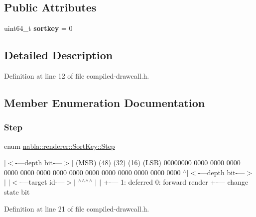 \subsection*{Public Attributes}
\begin{DoxyCompactItemize}
\item 
\mbox{\label{structnabla_1_1renderer_1_1_sort_key_a794eaacb6718584c3b6d2110cbca1c0e}} 
uint64\+\_\+t {\bfseries sortkey} = 0
\end{DoxyCompactItemize}


\subsection{Detailed Description}


Definition at line 12 of file compiled-\/drawcall.\+h.



\subsection{Member Enumeration Documentation}
\mbox{\label{structnabla_1_1renderer_1_1_sort_key_ae0121b7c60133bb8c0bf82785307f53a}} 
\subsubsection{\texorpdfstring{Step}{Step}\hspace{0.1cm}{\footnotesize\ttfamily [1/2]}}
{\footnotesize\ttfamily enum \mbox{\hyperlink{structnabla_1_1renderer_1_1_sort_key_ae0121b7c60133bb8c0bf82785307f53a}{nabla\+::renderer\+::\+Sort\+Key\+::\+Step}}}

$\vert$$<$-\/---depth bit-\/---$>$$\vert$ (M\+SB) (48) (32) (16) (L\+SB) 00000000 0000 0000 0000 0000 0000 0000 0000 0000 0000 0000 0000 0000 0000 0000 $^\wedge$$\vert$$<$-\/---depth bit-\/---$>$$\vert$ $\vert$$<$-\/---target id-\/---$>$$\vert$ $^\wedge$$^\wedge$$^\wedge$$^\wedge$ $\vert$ $\vert$ +-\/--- 1\+: deferred 0\+: forward render +-\/--- change state bit 

Definition at line 21 of file compiled-\/drawcall.\+h.

\mbox{\label{structnabla_1_1renderer_1_1_sort_key_ae0121b7c60133bb8c0bf82785307f53a}} 

